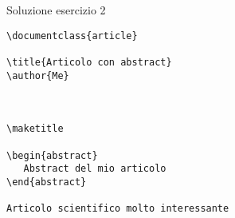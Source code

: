 \begin{frame}[fragile]{Soluzione esercizio 2}

\begin{lstlisting}
\documentclass{article}

\title{Articolo con abstract}
\author{Me}



\maketitle 

\begin{abstract}
   Abstract del mio articolo
\end{abstract}

Articolo scientifico molto interessante


\end{lstlisting}

\end{frame}